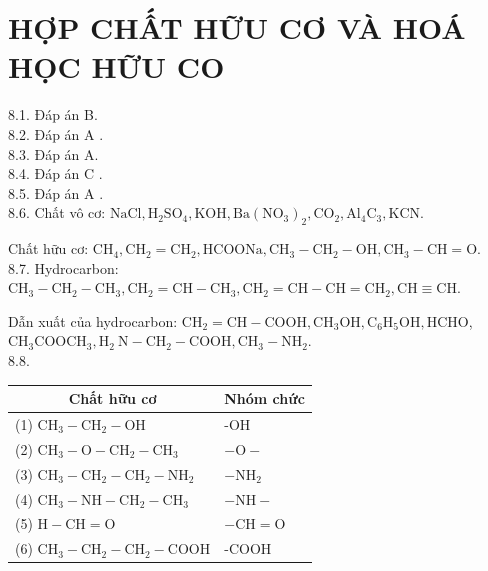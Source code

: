 \documentclass[10pt]{article}
\begin{document}
\section*{HỢP CHẤT HỮU CƠ VÀ HOÁ HỌC HỮU CO}
8.1. Đáp án B.\\
8.2. Đáp án A .\\
8.3. Đáp án A.\\
8.4. Đáp án C .\\
8.5. Đáp án A .\\
8.6. Chất vô cơ: $\mathrm{NaCl}, \mathrm{H}_{2} \mathrm{SO}_{4}, \mathrm{KOH}, \mathrm{Ba}\left(\mathrm{NO}_{3}\right)_{2}, \mathrm{CO}_{2}, \mathrm{Al}_{4} \mathrm{C}_{3}, \mathrm{KCN}$.

Chất hữu cơ: $\mathrm{CH}_{4}, \mathrm{CH}_{2}=\mathrm{CH}_{2}, \mathrm{HCOONa}, \mathrm{CH}_{3}-\mathrm{CH}_{2}-\mathrm{OH}, \mathrm{CH}_{3}-\mathrm{CH}=\mathrm{O}$.\\
8.7. Hydrocarbon: $\mathrm{CH}_{3}-\mathrm{CH}_{2}-\mathrm{CH}_{3}, \mathrm{CH}_{2}=\mathrm{CH}-\mathrm{CH}_{3}, \mathrm{CH}_{2}=\mathrm{CH}-\mathrm{CH}=\mathrm{CH}_{2}, \mathrm{CH} \equiv \mathrm{CH}$.

Dẫn xuất của hydrocarbon: $\mathrm{CH}_{2}=\mathrm{CH}-\mathrm{COOH}, \mathrm{CH}_{3} \mathrm{OH}, \mathrm{C}_{6} \mathrm{H}_{5} \mathrm{OH}, \mathrm{HCHO}$, $\mathrm{CH}_{3} \mathrm{COOCH}_{3}, \mathrm{H}_{2} \mathrm{~N}-\mathrm{CH}_{2}-\mathrm{COOH}, \mathrm{CH}_{3}-\mathrm{NH}_{2}$.\\
8.8.

\begin{center}
\begin{tabular}{|l|l|}
\hline
\multicolumn{1}{|c|}{Chất hữu cơ} & \multicolumn{1}{c|}{Nhóm chức} \\
\hline
(1) $\mathrm{CH}_{3}-\mathrm{CH}_{2}-\mathrm{OH}$ & -OH \\
\hline
(2) $\mathrm{CH}_{3}-\mathrm{O}-\mathrm{CH}_{2}-\mathrm{CH}_{3}$ & $-\mathrm{O}-$ \\
\hline
(3) $\mathrm{CH}_{3}-\mathrm{CH}_{2}-\mathrm{CH}_{2}-\mathrm{NH}_{2}$ & $-\mathrm{NH}_{2}$ \\
\hline
(4) $\mathrm{CH}_{3}-\mathrm{NH}-\mathrm{CH}_{2}-\mathrm{CH}_{3}$ & $-\mathrm{NH}-$ \\
\hline
(5) $\mathrm{H}-\mathrm{CH}=\mathrm{O}$ & $-\mathrm{CH}=\mathrm{O}$ \\
\hline
(6) $\mathrm{CH}_{3}-\mathrm{CH}_{2}-\mathrm{CH}_{2}-\mathrm{COOH}$ & -COOH \\
\hline
\end{tabular}
\end{center}
\end{document}

